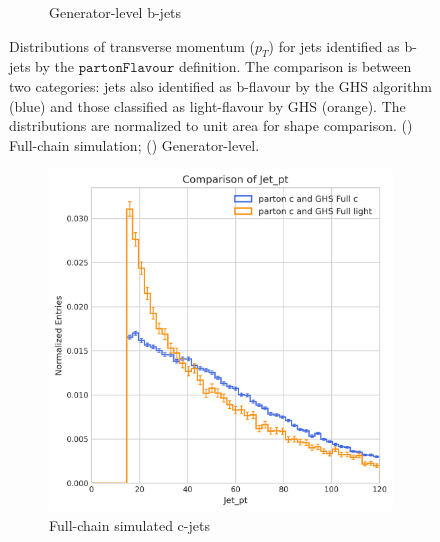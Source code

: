 \documentclass[10pt,twocolumn]{article}
\newcommand*{\parFlav}{\texttt{partonFlavour}}
\begin{document}
\begin{figure}[!htbp]
\begin{subfigure}[t]{0.48\textwidth}
        \caption{Generator-level b-jets}
        \label{fig:pt_b_parton_gen}
    \end{subfigure}
    \caption{Distributions of transverse momentum ($p_T$) for jets identified as b-jets by the $\parFlav$ definition. The comparison is between two categories: jets also identified as b-flavour by the GHS algorithm (blue) and those classified as light-flavour by GHS (orange). The distributions are normalized to unit area for shape comparison. () Full-chain simulation; () Generator-level.}
    \label{fig:pt_b_parton_combined}
\end{figure}

\begin{figure}[!htbp]
    \centering
    \begin{subfigure}[t]{0.48\textwidth}
        \centering
        \includegraphics[width=\textwidth]{images/compare_pt_GHSFull_light_vs_c_filter_partonFlavour_4.png}
        \caption{Full-chain simulated c-jets}
        \label{fig:pt_c_parton_full}
    \end{subfigure}
    \hfill
    \begin{subfigure}[t]{0.48\textwidth}
        \centering

\end{subfigure}
\end{figure}
\end{document}
